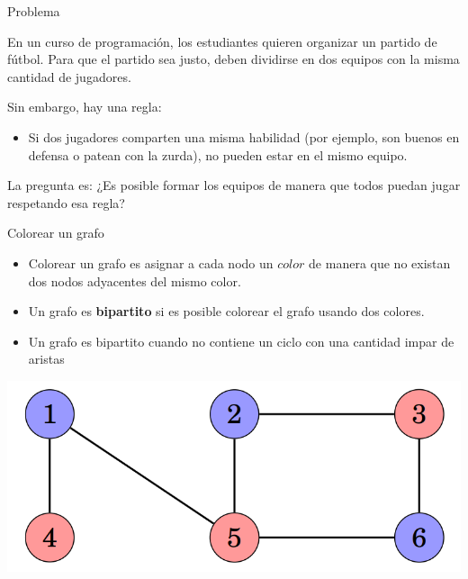 \documentclass{beamer}
\begin{document}
\begin{frame}{Problema}

	En un curso de programación, los estudiantes quieren organizar un partido de fútbol.
	Para que el partido sea justo, deben dividirse en dos equipos con la misma cantidad de jugadores.
	
	Sin embargo, hay una regla:
	\begin{itemize}
		\item Si dos jugadores comparten una misma habilidad (por ejemplo, son buenos en defensa o patean con la zurda), no pueden estar en el mismo equipo.
	\end{itemize}
	
	La pregunta es:
	¿Es posible formar los equipos de manera que todos puedan jugar respetando esa regla?
\end{frame}

\begin{frame}{Colorear un grafo}
	\begin{itemize}
		\item Colorear un grafo es asignar a cada nodo un $color$ de manera que no existan dos nodos adyacentes del mismo color.
		\item Un grafo es \textbf{bipartito} si es posible colorear el grafo usando dos colores.
		\item Un grafo es bipartito cuando no contiene un ciclo con una cantidad impar de aristas
	\end{itemize}
	
	\centering
	\includegraphics[scale=0.3]{figuras/grafo-bipartito.PNG}
\end{frame}
\end{document}

